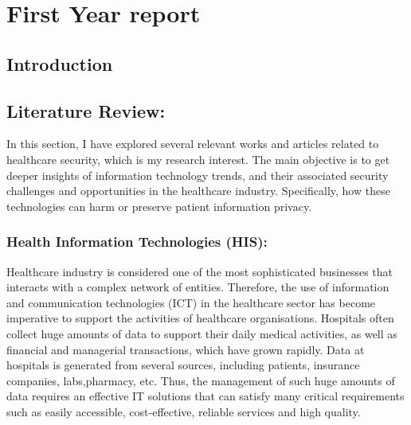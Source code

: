 


\chapter{First Year report}

\label{c:First Year}

\section{Introduction}


\section{Literature Review:}
In this section, I have explored several relevant works and articles related to healthcare security, which is my research interest. The main objective is to get deeper insights of information technology trends, and their associated security challenges and opportunities in the healthcare industry. Specifically, how these technologies can harm or preserve patient information privacy.
\subsection{Health Information Technologies (HIS):}

Healthcare industry is considered one of the most sophisticated businesses that interacts with a complex network of entities. Therefore, the use of information and communication technologies (ICT) in the healthcare sector has become imperative to support the activities of healthcare organisations. Hospitals often collect huge amounts of data to support their daily medical activities, as well as financial and managerial transactions, which have grown rapidly. Data at hospitals is generated from several sources, including patients, insurance companies, labs,pharmacy, etc. Thus, the management of such huge amounts of data requires an effective IT solutions that can satisfy many critical requirements such as easily accessible, cost-effective, reliable services and high quality.

